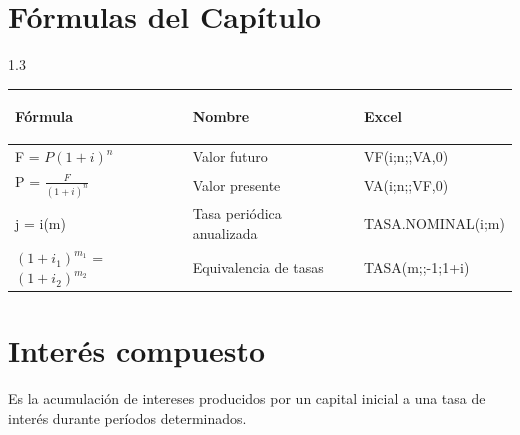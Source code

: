 \section{{Fórmulas del Capítulo}}
\begin{spacing}{1.3}
   \begin{center}
      \begin{tabular}{ |p{4cm}|p{5cm}| p{5cm}|}
         \hline
         \rowcolor{orange!50}
         \begin{center}\textbf{Fórmula} \end{center}   & \begin{center} \textbf{Nombre}\end{center} & \begin{center} \textbf{Excel} \end{center} \\ \hline
         F = $P(1+i)^n$                                & Valor futuro                               & VF(i;n;;VA,0)                              \\ \hline
         P = $\frac{F}{(1 + i)^{n}}$                   & Valor presente                             & VA(i;n;;VF,0)                              \\ \hline
         j = i(m)                                      & Tasa periódica anualizada                  & TASA.NOMINAL(i;m)                          \\ \hline
         ${(1 + i_{1})^{m_1}}$ = ${(1 + i_{2})^{m_2}}$ & Equivalencia de tasas                      & TASA(m;;-1;1+i)                            \\ \hline
      \end{tabular}
   \end{center}
\end{spacing}
\section{Interés compuesto}
Es la acumulación de intereses producidos por un capital inicial a una tasa de interés durante períodos determinados.\\



